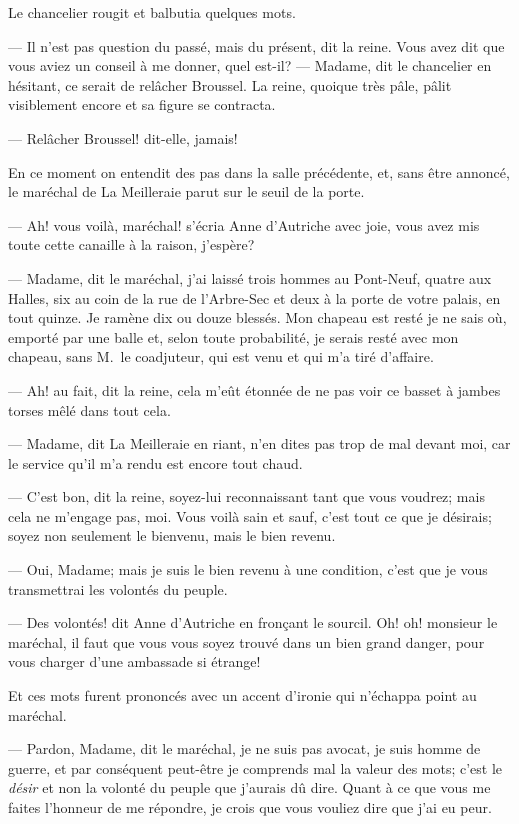 Le chancelier rougit et balbutia quelques mots.

— Il n'est pas question du passé, mais du présent, dit la reine. Vous avez dit que vous aviez un conseil à me donner, quel est-il?
— Madame, dit le chancelier en hésitant, ce serait de relâcher Broussel.
La reine, quoique très pâle, pâlit visiblement encore et sa figure se contracta.

— Relâcher Broussel! dit-elle, jamais!

En ce moment on entendit des pas dans la salle précédente, et, sans être annoncé, le maréchal de La Meilleraie parut sur le seuil de la porte.

— Ah! vous voilà, maréchal! s'écria Anne d'Autriche avec joie, vous avez mis toute cette canaille à la raison, j'espère?

— Madame, dit le maréchal, j'ai laissé trois hommes au Pont-Neuf, quatre aux Halles, six au coin de la rue de l'Arbre-Sec et deux à la porte de votre palais, en tout quinze. Je ramène dix ou douze blessés. Mon chapeau est resté je ne sais où, emporté par une balle et, selon toute probabilité, je serais resté avec mon chapeau, sans M.~le coadjuteur, qui est venu et qui m'a tiré d'affaire.

— Ah! au fait, dit la reine, cela m'eût étonnée de ne pas voir ce basset à jambes torses mêlé dans tout cela.

— Madame, dit La Meilleraie en riant, n'en dites pas trop de mal devant moi, car le service qu'il m'a rendu est encore tout chaud.

— C'est bon, dit la reine, soyez-lui reconnaissant tant que vous voudrez; mais cela ne m'engage pas, moi. Vous voilà sain et sauf, c'est tout ce que je désirais; soyez non seulement le bienvenu, mais le bien revenu.

— Oui, Madame; mais je suis le bien revenu à une condition, c'est que je vous transmettrai les volontés du peuple.

— Des volontés! dit Anne d'Autriche en fronçant le sourcil. Oh! oh! monsieur le maréchal, il faut que vous vous soyez trouvé dans un bien grand danger, pour vous charger d'une ambassade si étrange!

Et ces mots furent prononcés avec un accent d'ironie qui n'échappa point au maréchal.

— Pardon, Madame, dit le maréchal, je ne suis pas avocat, je suis homme de guerre, et par conséquent peut-être je comprends mal la valeur des mots; c'est le \textit{désir} et non la volonté du peuple que j'aurais dû dire. Quant à ce que vous me faites l'honneur de me répondre, je crois que vous vouliez dire que j'ai eu peur.

